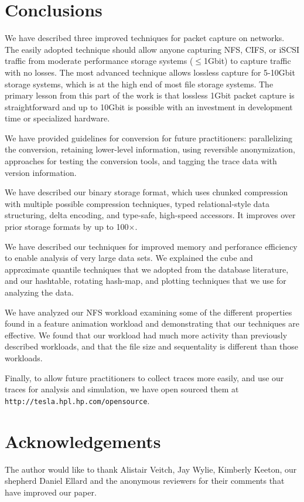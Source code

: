 \section{Conclusions}
\label{sec:conclusion}

We have described three improved techniques for packet capture on
networks.  The easily adopted technique should allow anyone capturing
NFS, CIFS, or iSCSI traffic from moderate performance storage systems
($\leq$1Gbit) to capture traffic with no losses.  The most advanced
technique allows lossless capture for 5-10Gbit storage systems, which
is at the high end of most file storage systems. The primary lesson
from this part of the work is that lossless 1Gbit packet capture is
straightforward and up to 10Gbit is possible with an investment in
development time or specialized hardware.

We have provided guidelines for conversion for future practitioners:
parallelizing the conversion, retaining lower-level information, using
reversible anonymization, approaches for testing the conversion tools,
and tagging the trace data with version information.

We have described our binary storage format, which uses chunked
compression with multiple possible compression techniques, typed
relational-style data structuring, delta encoding, and type-safe,
high-speed accessors.  It improves over prior storage formats by up to
100$\times$.

We have described our techniques for improved memory and perforance
efficiency to enable analysis of very large data sets.  We 
explained the cube and approximate quantile techniques that we adopted
from the database literature, and our hashtable, rotating hash-map, and
plotting techniques that we use for analyzing the data.

We have analyzed our NFS workload examining some of the different
properties found in a feature animation workload and demonstrating
that our techniques are effective.  We found that our workload had
much more activity than previously described workloads, and that the
file size and sequentality is different than those workloads.

Finally, to allow future practitioners to collect traces more easily,
and use our traces for analysis and simulation, we have open sourced
them at {\tt http://tesla.hpl.hp.com/opensource}.

\section{Acknowledgements}

The author would like to thank Alistair Veitch, Jay Wylie, Kimberly
Keeton, our shepherd Daniel Ellard and the anonymous reviewers for
their comments that have improved our paper.

